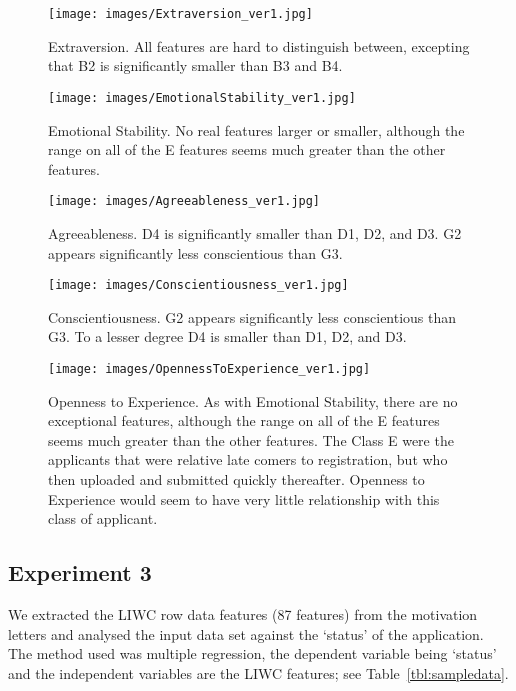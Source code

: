 \documentclass[letterpaper]{article}
\begin{document}
\begin{figure}[!h]
\centering
\texttt{[image: images/Extraversion\_ver1.jpg]}
\caption{Extraversion. All features are hard to distinguish between, excepting that B2 is
significantly smaller than B3 and B4.}
\label{fig:extraversion}
\end{figure}

\begin{figure}[!h]
\centering
\texttt{[image: images/EmotionalStability\_ver1.jpg]}
\caption{Emotional Stability. No real features larger or smaller, although the range on all of the E
features seems much greater than the other features.}
\label{fig:emotstab}
\end{figure}

\begin{figure}[!h]
\centering
\texttt{[image: images/Agreeableness\_ver1.jpg]}
\caption{Agreeableness. D4 is significantly smaller than D1, D2, and D3. G2 appears
significantly less conscientious than G3.}
\label{fig:agreeableness}
\end{figure}

\begin{figure}[!h]
\centering
\texttt{[image: images/Conscientiousness\_ver1.jpg]}
\caption{Conscientiousness. G2 appears significantly less conscientious than G3. To a lesser
degree D4 is smaller than D1, D2, and D3.}
\label{fig:conscientiousness}
\end{figure}

\begin{figure}[!h]
\centering
\texttt{[image: images/OpennessToExperience\_ver1.jpg]}
\caption{Openness to Experience. As with Emotional Stability, there are no exceptional features,
although the range on all of the E features seems much greater than
the other features. The Class E were the applicants that were relative
late comers to registration, but who then uploaded and submitted
quickly thereafter. Openness to Experience would seem to have very
little relationship with this class of applicant.}
\label{fig:openexp}
\end{figure}

\subsection{Experiment 3}

We extracted the LIWC row data features (87 features) from the
motivation letters and analysed the input data set against the
`status' of the application. The method used was multiple regression,
the dependent variable being `status' and the independent variables
are the LIWC features; see Table~\ref{tbl:sampledata}.
\end{document}
